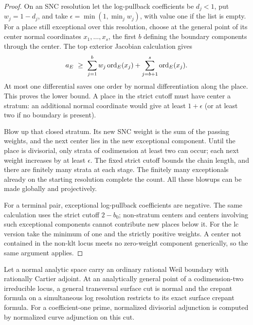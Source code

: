 \begin{proof}
On an SNC resolution let the log-pullback coefficients be $d_j<1$,
put $w_j=1-d_j$, and take
$\epsilon=\min(1,\min_jw_j)$, with value one if the list is empty.
For a place still exceptional over this resolution, choose at the
general point of its center normal coordinates $x_1,\ldots,x_s$,
the first $b$ defining the boundary components through the center.
The top exterior Jacobian calculation gives
\begin{equation}
 a_E\ \geq\ \sum_{j=1}^{b}w_j\ord_E(x_j)
             +\sum_{j=b+1}^{s}\ord_E(x_j).
 \label{bir:jacobian-bound}
\end{equation}
At most one differential saves one order by normal differentiation
along the place.  This proves the lower bound.  A place in the
strict cutoff must have center a stratum: an additional normal
coordinate would give at least $1+\epsilon$ (or at least two if no
boundary is present).

Blow up that closed stratum.  Its new SNC weight is the sum of the
passing weights, and the next center lies in the new exceptional
component.  Until the place is divisorial, only strata of codimension
at least two can occur; each next weight increases by at least
$\epsilon$.  The fixed strict cutoff bounds the chain length, and
there are finitely many strata at each stage.  The finitely many
exceptionals already on the starting resolution complete the count.
All these blowups can be made globally and projectively.

For a terminal pair, exceptional log-pullback coefficients are
negative.  The same calculation uses the strict cutoff $2-b_0$;
non-stratum centers and centers involving such exceptional
components cannot contribute new places below it.  For the lc
version take the minimum of one and the strictly positive weights.
A center not contained in the non-klt locus meets no zero-weight
component generically, so the same argument applies.
\end{proof}

\begin{lemma}
\label{bir:transversal}
Let a normal analytic space carry an ordinary rational Weil boundary
with rationally Cartier adjoint.  At an analytically general point
of a codimension-two irreducible locus, a general transversal surface
cut is normal and the crepant formula on a simultaneous log resolution
restricts to its exact surface crepant formula.  For a coefficient-one
prime, normalized divisorial adjunction is computed by normalized
curve adjunction on this cut.
\end{lemma}

